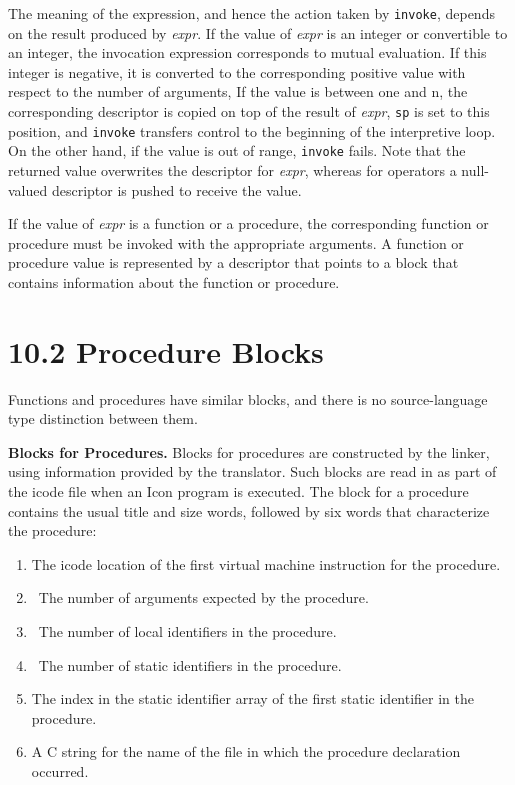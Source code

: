 The meaning of the expression, and hence the action taken by
\texttt{invoke}, depends on the result produced by
\textit{expr}. If the value of
\textit{expr} is an integer or convertible to an
integer, the invocation expression corresponds to mutual
evaluation. If this integer is negative, it is converted to the
corresponding positive value with respect to the number of arguments,
If the value is between one and n, the corresponding descriptor is
copied on top of the result of \textit{expr},
\texttt{sp} is set to this position, and \texttt{invoke} transfers
control to the beginning of the interpretive loop. On the other hand,
if the value is out of range, \texttt{invoke} fails. Note that the
returned value overwrites the descriptor for
\textit{expr}, whereas for operators a null-valued
descriptor is pushed to receive the value.

If the value of \textit{expr} is a function or a
procedure, the corresponding function or procedure must be invoked
with the appropriate arguments. A function or procedure value is
represented by a descriptor that points to a block that contains
information about the function or procedure.

\section[10.2 Procedure Blocks]{10.2 Procedure Blocks}

Functions and procedures have similar blocks, and there is no
source-language type distinction between them.

\textbf{Blocks for Procedures. }Blocks for procedures are constructed
by the linker, using information provided by the translator. Such
blocks are read in as part of the icode file when an Icon program is
executed. The block for a procedure contains the usual title and size
words, followed by six words that characterize the procedure:

\liststyleLxi
\begin{enumerate}
\item 
The icode location of the first virtual machine instruction for the procedure.
\item 
\ The number of arguments expected by the procedure.
\item 
\ The number of local identifiers in the procedure.
\item 
\ The number of static identifiers in the procedure.
\item 
The index in the static identifier array of the first
static identifier in the procedure.
\item 
A C string for the name of the file in which the procedure
declaration occurred.
\end{enumerate}

